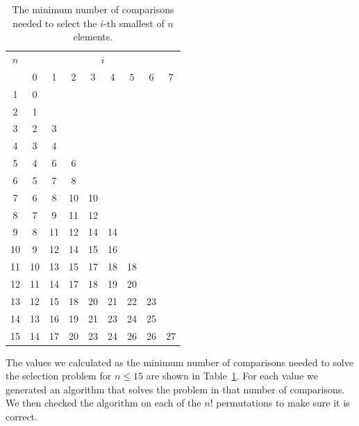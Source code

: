 \documentclass[10pt,journal,compsoc]{IEEEtran}
\begin{document}
\begin{table}[!t]
  \renewcommand{\arraystretch}{1.2}
  \caption{The minimum number of comparisons needed to select the $i$-th smallest of $n$ elements.}
  \label{table:num-comparisons}
  \centering
  \begin{tabular}{c|cccccccc}
    $n$ & \multicolumn{8}{c}{$i$}                                    \\
        & 0                       & 1  & 2  & 3  & 4  & 5  & 6  & 7  \\ \hline
    1   & 0                                                          \\
    2   & 1                                                          \\
    3   & 2                       & 3                                \\
    4   & 3                       & 4                                \\
    5   & 4                       & 6  & 6                           \\
    6   & 5                       & 7  & 8                           \\
    7   & 6                       & 8  & 10 & 10                     \\
    8   & 7                       & 9  & 11 & 12                     \\
    9   & 8                       & 11 & 12 & 14 & 14                \\
    10  & 9                       & 12 & 14 & 15 & 16                \\
    11  & 10                      & 13 & 15 & 17 & 18 & 18           \\
    12  & 11                      & 14 & 17 & 18 & 19 & 20           \\
    13  & 12                      & 15 & 18 & 20 & 21 & 22 & 23      \\
    14  & 13                      & 16 & 19 & 21 & 23 & 24 & 25      \\
    15  & 14                      & 17 & 20 & 23 & 24 & 26 & 26 & 27 \\
  \end{tabular}
\end{table}

The values we calculated as the minimum number of comparisons needed to solve the selection problem for $n \leq 15$ are shown in Table~\ref{table:num-comparisons}.
For each value we generated an algorithm that solves the problem in that number of comparisons.
We then checked the algorithm on each of the $n!$ permutations to make sure it is correct.
\end{document}
